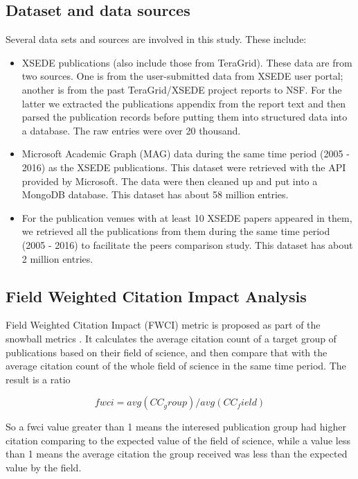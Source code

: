 \documentclass{sig-alternate}
\begin{document}
\subsection{Dataset and data sources}

Several data sets and sources are involved in this study. These include:

\begin{itemize}
    \item XSEDE publications (also include those from TeraGrid). These data are from
two sources. One is from the user-submitted data from XSEDE user portal; another
is from the past TeraGrid/XSEDE project reports to NSF. For the latter we extracted the publications
appendix from the report text and then parsed the publication records before putting
them into structured data into a database. The raw entries were over 20 thousand.
    \item Microsoft Academic Graph (MAG) data during the same time period (2005 - 2016) as the XSEDE
publications. This dataset were retrieved with the API provided by Microsoft. The data were
then cleaned up and put into a MongoDB database. This dataset has about 58 million entries.
    \item For the publication venues with at least 10 XSEDE papers appeared in them, we retrieved
all the publications from them during the same time period (2005 - 2016) to facilitate the peers
comparison study. This dataset has about 2 million entries.
\end{itemize}

\subsection{Field Weighted Citation Impact Analysis}

Field Weighted Citation Impact (FWCI) metric is proposed as part of the
snowball metrics \cite{colledge2014snowball}. It calculates the average
citation count of a target group of publications based on their field of
science, and then compare that with the average citation count of the whole
field of science in the same time period. The result is a ratio

\[	fwci = avg(CC_group)/avg(CC_field) \]

So a fwci value greater than 1 means the interesed publication group had higher
citation comparing to the expected value of the field of science, while a value
less than 1 means the average citation the group received was less than the expected
value by the field.
\end{document}
